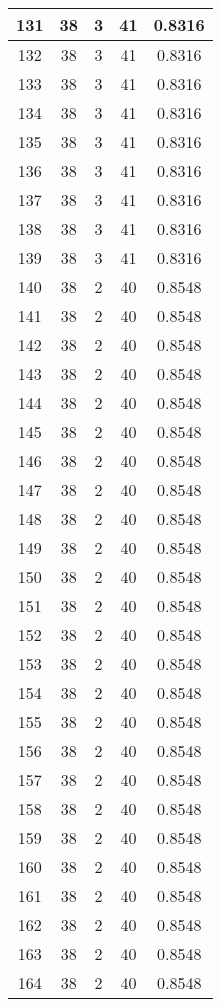 \documentclass[letterpaper, 12pt]{article}
\begin{document}
\begin{longtable}{|c|c|c|c|c|}
\hline
131 & 38 & 3 & 41 & 0.8316 \\
\hline
132 & 38 & 3 & 41 & 0.8316 \\
\hline
133 & 38 & 3 & 41 & 0.8316 \\
\hline
134 & 38 & 3 & 41 & 0.8316 \\
\hline
135 & 38 & 3 & 41 & 0.8316 \\
\hline
136 & 38 & 3 & 41 & 0.8316 \\
\hline
137 & 38 & 3 & 41 & 0.8316 \\
\hline
138 & 38 & 3 & 41 & 0.8316 \\
\hline
139 & 38 & 3 & 41 & 0.8316 \\
\hline
140 & 38 & 2 & 40 & 0.8548 \\
\hline
141 & 38 & 2 & 40 & 0.8548 \\
\hline
142 & 38 & 2 & 40 & 0.8548 \\
\hline
143 & 38 & 2 & 40 & 0.8548 \\
\hline
144 & 38 & 2 & 40 & 0.8548 \\
\hline
145 & 38 & 2 & 40 & 0.8548 \\
\hline
146 & 38 & 2 & 40 & 0.8548 \\
\hline
147 & 38 & 2 & 40 & 0.8548 \\
\hline
148 & 38 & 2 & 40 & 0.8548 \\
\hline
149 & 38 & 2 & 40 & 0.8548 \\
\hline
150 & 38 & 2 & 40 & 0.8548 \\
\hline
151 & 38 & 2 & 40 & 0.8548 \\
\hline
152 & 38 & 2 & 40 & 0.8548 \\
\hline
153 & 38 & 2 & 40 & 0.8548 \\
\hline
154 & 38 & 2 & 40 & 0.8548 \\
\hline
155 & 38 & 2 & 40 & 0.8548 \\
\hline
156 & 38 & 2 & 40 & 0.8548 \\
\hline
157 & 38 & 2 & 40 & 0.8548 \\
\hline
158 & 38 & 2 & 40 & 0.8548 \\
\hline
159 & 38 & 2 & 40 & 0.8548 \\
\hline
160 & 38 & 2 & 40 & 0.8548 \\
\hline
161 & 38 & 2 & 40 & 0.8548 \\
\hline
162 & 38 & 2 & 40 & 0.8548 \\
\hline
163 & 38 & 2 & 40 & 0.8548 \\
\hline
164 & 38 & 2 & 40 & 0.8548 \\

\end{longtable}
\end{document}
